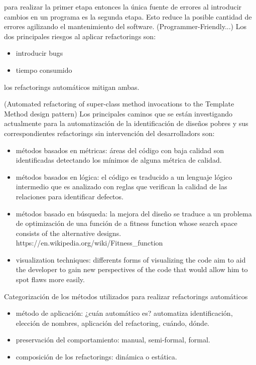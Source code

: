 para realizar la primer etapa entonces la única fuente de errores al introducir cambios en un
programa es la segunda etapa. Esto reduce la posible cantidad de errores agilizando el mantenimiento
del software.
(Programmer-Friendly...) Los dos principales riesgos al aplicar refactorings son:

\begin{itemize}
    \item introducir bugs
    \item tiempo consumido
\end{itemize}

los refactorings automáticos mitigan ambas.

(Automated refactoring of super-class method invocations to the Template Method design pattern) Los
principales caminos que se están investigando actualmente para la automatización de la
identificación de diseños pobres y sus correspondientes refactorings sin intervención del
desarrolladors son:

\begin{itemize}
    \item métodos basados en métricas: áreas del código con baja calidad son identificadas detectando
    los mínimos de alguna métrica de calidad.
    \item métodos basados en lógica: el código es traducido a un lenguaje lógico intermedio que es analizado
    con reglas que verifican la calidad de las relaciones para identificar defectos.
    \item métodos basado en búsqueda: la mejora del diseño se traduce a un problema de optimización de una función de 
    a fitness function whose search space consists of the alternative designs.
    https://en.wikipedia.org/wiki/Fitness_function
    \item visualization techniques: differents forms of visualizing the code aim to aid the
    developer to gain new perspectives of the code that would allow him to spot flaws more easily.
\end{itemize}

Categorización de los métodos utilizados para realizar refactorings automáticos

\begin{itemize}
    \item método de aplicación: ¿cuán automático es? automatiza identificación, elección de nombres, aplicación del refactoring, cuándo, dónde.
    \item preservación del comportamiento: manual, semi-formal, formal.
    \item composición de los refactorings: dinámica o estática.
\end{itemize}

